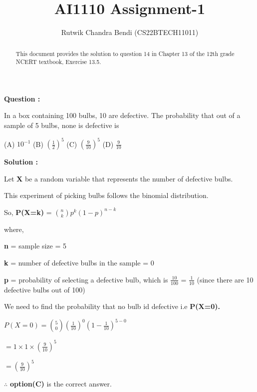 \documentclass[journal,12pt,onecolumn]{article}
\title{AI1110 Assignment-1}
\author{Rutwik Chandra Bendi (CS22BTECH11011)}
\begin{document}
\maketitle
\begin{abstract}
This document provides the solution to question 14 in Chapter 13 of the 12th grade NCERT textbook, Exercise 13.5.
\end{abstract}\par
\textbf{Question : }\par
\vspace{0.2cm} In a box containing 100 bulbs, 10 are defective. The probability that out of a sample of 5 bulbs, none is defective is\par 
(A) $10^{-1}$  (B) $\left(\frac{1}{2}\right)^5$  (C) $\left(\frac{9}{10}\right)^5$  (D) $\frac{9}{10}$ \par
\vspace{0.2cm}\textbf{Solution : }\par
\vspace{0.2cm} Let \textbf{X} be a random variable that represents the number of defective bulbs.\par
\vspace{0.2cm} This experiment of picking bulbs follows the binomial distribution.\par
\vspace{0.2cm} So, \quad \textbf{P(X=k)} = ${n\choose k}p^k (1-p)^{n-k}$\par
\vspace{0.2cm} where,\par
\vspace{0.2cm} \textbf{n} = sample size = 5\par
\textbf{k} = number of defective bulbs in the sample = 0 \par
\textbf{p} = probability of selecting a defective bulb, which is $\frac{10}{100}$ = $\frac{1}{10}$ (since there are 10 defective bulbs out of 100)\par
\vspace{0.2cm} We need to find the probability that no bulb id defective i.e \textbf{P(X=0).}\par
\vspace{0.5cm} $P(X=0) = {5\choose 0}(\frac{1}{10})^0(1-\frac{1}{10})^{5-0}$\par
\vspace{0.5cm} \hspace{1.6cm} $= 1\times1\times(\frac{9}{10})^5$\par
\vspace{0.5cm} \hspace{1.6cm} $=(\frac{9}{10})^5$\par
\vspace{0.5cm}  $\therefore$ \textbf{option(C)} is the correct answer.
\end{document}

